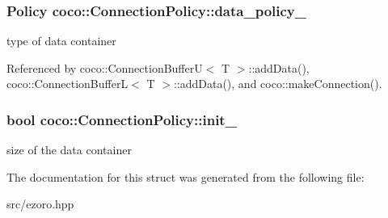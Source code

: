 \hypertarget{structcoco_1_1_connection_policy_aa37517fcc9cd9bfd6d3922023b16a488}{
\subsubsection[{data\-\_\-policy\-\_\-}]{\setlength{\rightskip}{0pt plus 5cm}Policy coco\-::\-Connection\-Policy\-::data\-\_\-policy\-\_\-}}\label{structcoco_1_1_connection_policy_aa37517fcc9cd9bfd6d3922023b16a488}
type of data container 

Referenced by coco\-::\-Connection\-Buffer\-U$<$ T $>$\-::add\-Data(), coco\-::\-Connection\-Buffer\-L$<$ T $>$\-::add\-Data(), and coco\-::make\-Connection().

\hypertarget{structcoco_1_1_connection_policy_a359054d26257b4e074d69b943d8453e8}{
\subsubsection[{init\-\_\-}]{\setlength{\rightskip}{0pt plus 5cm}bool coco\-::\-Connection\-Policy\-::init\-\_\-}}\label{structcoco_1_1_connection_policy_a359054d26257b4e074d69b943d8453e8}
size of the data container 

The documentation for this struct was generated from the following file\-:\begin{DoxyCompactItemize}
\item 
src/ezoro.\-hpp\end{DoxyCompactItemize}

